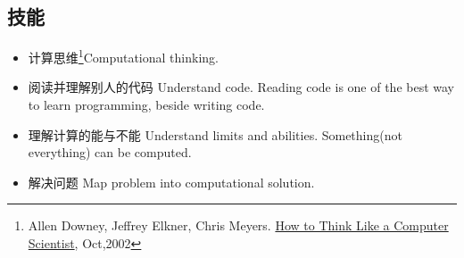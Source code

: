 \subsection{技能}
\begin{itemize}
\item 计算思维\footnote{Allen Downey, Jeffrey Elkner, Chris
    Meyers. \protect\href{http://openbookproject.net/thinkcs/python/english3e/index.html}{How
      to Think Like a Computer Scientist}, Oct,2002}Computational
  thinking.
\item 阅读并理解别人的代码 Understand code.  Reading code is one of the
  best way to learn programming, beside writing code.
\item 理解计算的能与不能 Understand limits and abilities.  Something(not
  everything) can be computed. %
\item 解决问题 Map problem into computational solution.　
\end{itemize}


